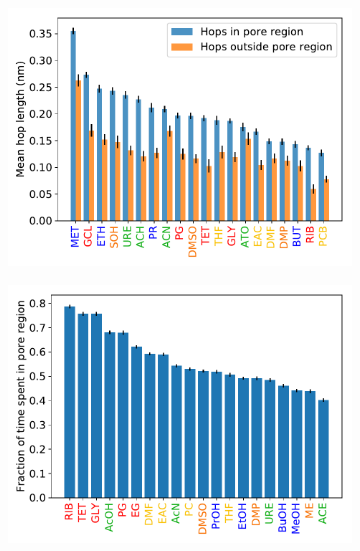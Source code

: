 \documentclass{article}
\begin{document}
  \begin{figure}[!htb]
  \centering
  \begin{subfigure}{0.325\textwidth}
  \includegraphics[width=\linewidth]{hop_length.pdf}
  \caption{}\label{fig:hop_lengths}
  \end{subfigure}
  \begin{subfigure}{0.325\textwidth}
  \includegraphics[width=\textwidth]{frac_time_spent.pdf}
  \caption{}\label{fig:frac_time}
  \end{subfigure}
  \begin{subfigure}{0.325\textwidth}

\end{subfigure}
\end{figure}
\end{document}
